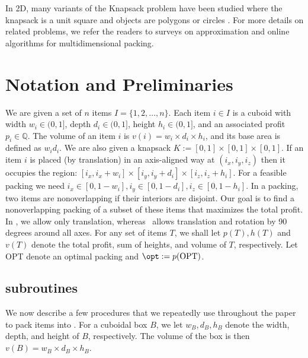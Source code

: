 In 2D, many variants of the Knapsack problem have been studied where the knapsack is a unit square and objects are polygons \cite{MerinoW20} or circles \cite{AcharyaBG0MW24, ChagasNew}. 
For more details on related problems, we refer the readers to surveys \cite{alt2016computational, CKPT17} on approximation and online algorithms for multidimensional packing.



\section{Notation and Preliminaries}
\label{sec:prelim}
We are given a set of $n$ items $I=\{1, 2, \dots, n\}$.
Each item $i \in I$ is a cuboid with width $w_i \in (0,1]$, depth $d_i \in (0,1]$, height $h_i \in (0,1]$, and  an associated profit $p_i \in \mathbb{Q}$.
The volume of an item $i$ is $v(i)=w_i \times d_i \times h_i$,
and its base area is defined as $w_id_i$.
We are also given a knapsack $K:=[0,1]\times [0,1] \times [0,1]$.
If an item $i$ is placed (by translation) in an axis-aligned way at $(i_x, i_y, i_z)$ then it occupies the region: $[i_x, i_x+w_i]\times [i_y, i_y+d_i] \times [i_z, i_z+h_i]$.
For a feasible packing we need $i_x \in [0, 1-w_i], i_y \in [0, 1-d_i], i_z \in [0, 1-h_i]$.
In a packing, two items are nonoverlapping if their interiors are disjoint. 
Our goal is to find a nonoverlapping packing of a subset of these items that maximizes the total profit.
In \tdk, we allow only translation, whereas \tdkr~allows translation and rotation by 90 degrees around all axes.
For any set of items $T$, we shall let $p(T), h(T)$ and $v(T)$ denote the total profit, sum of heights, and volume of $T$, respectively. Let OPT denote an optimal packing and $\opt := p(\text{OPT})$.
\subsection{ subroutines}
\label{sec:subroutines}
We now describe a few procedures that we repeatedly use throughout the paper to pack items into \boxes. For a cuboidal box $B$, we let $w_B, d_B, h_B$ denote the width, depth, and height of $B$, respectively. The volume of the box is then $v(B) = w_B \times d_B \times h_B$.

